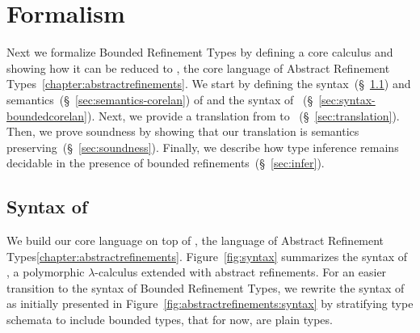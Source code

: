 \section{Formalism}\label{sec:check}

Next we formalize Bounded Refinement Types by defining
a core calculus \boundedcorelan and showing how it can
be reduced to \corelan, the core language of Abstract
Refinement Types~\ref{chapter:abstractrefinements}.
%
We start by defining the syntax~(\S~\ref{sec:syntax-corelan})
and semantics~(\S~\ref{sec:semantics-corelan}) of \corelan
and the syntax of \boundedcorelan~(\S~\ref{sec:syntax-boundedcorelan}).
%
Next, we provide a translation from \boundedcorelan to
\corelan ~(\S~\ref{sec:translation}).
%
Then, we prove soundness by showing that our translation
is semantics preserving~(\S~\ref{sec:soundness}).
%
Finally, we describe how type inference remains
decidable in the presence of bounded refinements~(\S~\ref{sec:infer}).


\subsection{Syntax of \corelan}\label{sec:syntax-corelan}



We build our core language on top of \corelan, the language
of Abstract Refinement Types\ref{chapter:abstractrefinements}.
%
Figure~\ref{fig:syntax} summarizes the syntax of \corelan,
a polymorphic $\lambda$-calculus extended with abstract
refinements.
%
For an easier transition to the syntax of Bounded Refinement Types, 
we rewrite the syntax of \corelan as initially presented in Figure~\ref{fig:abstractrefinements:syntax}
by stratifying type schemata to include bounded types, that for now, 
are plain types.


